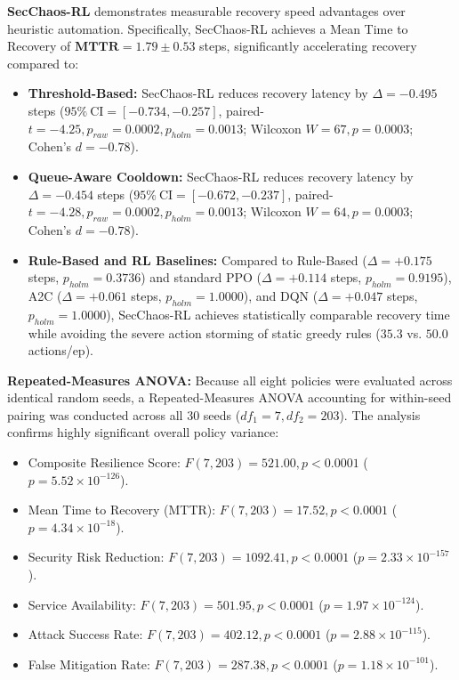 \documentclass[11pt,a4paper]{article}
\begin{document}
\textbf{SecChaos-RL} demonstrates measurable recovery speed advantages over heuristic automation. Specifically, SecChaos-RL achieves a Mean Time to Recovery of $\mathbf{\text{MTTR} = 1.79 \pm 0.53}$ steps, significantly accelerating recovery compared to:
\begin{itemize}
    \item \textbf{Threshold-Based:} SecChaos-RL reduces recovery latency by $\Delta = -0.495$ steps ($95\%\ \text{CI} = [-0.734, -0.257]$, paired-$t = -4.25, p_{raw} = 0.0002, p_{holm} = 0.0013$; Wilcoxon $W = 67, p = 0.0003$; Cohen's $d = -0.78$).
    \item \textbf{Queue-Aware Cooldown:} SecChaos-RL reduces recovery latency by $\Delta = -0.454$ steps ($95\%\ \text{CI} = [-0.672, -0.237]$, paired-$t = -4.28, p_{raw} = 0.0002, p_{holm} = 0.0013$; Wilcoxon $W = 64, p = 0.0003$; Cohen's $d = -0.78$).
    \item \textbf{Rule-Based and RL Baselines:} Compared to Rule-Based ($\Delta = +0.175$ steps, $p_{holm} = 0.3736$) and standard PPO ($\Delta = +0.114$ steps, $p_{holm} = 0.9195$), A2C ($\Delta = +0.061$ steps, $p_{holm} = 1.0000$), and DQN ($\Delta = +0.047$ steps, $p_{holm} = 1.0000$), SecChaos-RL achieves statistically comparable recovery time while avoiding the severe action storming of static greedy rules ($35.3$ vs. $50.0$ actions/ep).
\end{itemize}

\textbf{Repeated-Measures ANOVA:} Because all eight policies were evaluated across identical random seeds, a Repeated-Measures ANOVA accounting for within-seed pairing was conducted across all 30 seeds ($df_1 = 7, df_2 = 203$). The analysis confirms highly significant overall policy variance:
\begin{itemize}
    \item Composite Resilience Score: $F(7, 203) = 521.00, p < 0.0001$ ($p = 5.52 \times 10^{-126}$).
    \item Mean Time to Recovery (MTTR): $F(7, 203) = 17.52, p < 0.0001$ ($p = 4.34 \times 10^{-18}$).
    \item Security Risk Reduction: $F(7, 203) = 1092.41, p < 0.0001$ ($p = 2.33 \times 10^{-157}$).
    \item Service Availability: $F(7, 203) = 501.95, p < 0.0001$ ($p = 1.97 \times 10^{-124}$).
    \item Attack Success Rate: $F(7, 203) = 402.12, p < 0.0001$ ($p = 2.88 \times 10^{-115}$).
    \item False Mitigation Rate: $F(7, 203) = 287.38, p < 0.0001$ ($p = 1.18 \times 10^{-101}$).
\end{itemize}
\end{document}
